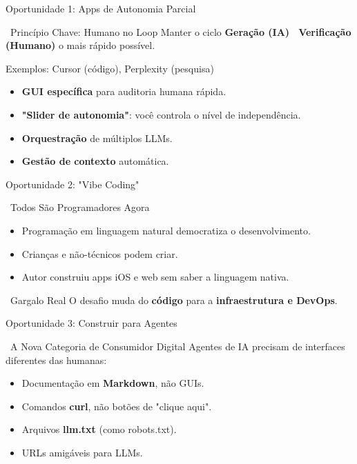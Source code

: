 \documentclass[aspectratio=169,12pt]{beamer}
\begin{document}
\begin{frame}{Oportunidade 1: Apps de Autonomia Parcial}
    \begin{block}{\faWrench\, Princípio Chave: Humano no Loop}
        Manter o ciclo \textbf{Geração (IA) \faArrowRight\, Verificação (Humano)} o mais rápido possível.
    \end{block}
    
    \begin{exampleblock}{Exemplos: Cursor (código), Perplexity (pesquisa)}
        \begin{itemize}
            \item \textbf{GUI específica} para auditoria humana rápida.
            \item \textbf{"Slider de autonomia"}: você controla o nível de independência.
            \item \textbf{Orquestração} de múltiplos LLMs.
            \item \textbf{Gestão de contexto} automática.
        \end{itemize}
    \end{exampleblock}
\end{frame}

\begin{frame}{Oportunidade 2: "Vibe Coding"}
    \begin{block}{\faUsers\, Todos São Programadores Agora}
        \begin{itemize}
            \item Programação em linguagem natural democratiza o desenvolvimento.
            \item Crianças e não-técnicos podem criar.
            \item Autor construiu apps iOS e web sem saber a linguagem nativa.
        \end{itemize}
    \end{block}
    
    \begin{alertblock}{\faExclamationTriangle\, Gargalo Real}
        O desafio muda do \textbf{código} para a \textbf{infraestrutura e DevOps}.
    \end{alertblock}
\end{frame}

\begin{frame}{Oportunidade 3: Construir para Agentes}
    \begin{block}{\faRobot\, A Nova Categoria de Consumidor Digital}
        Agentes de IA precisam de interfaces diferentes das humanas:
        \begin{itemize}
            \item Documentação em \textbf{Markdown}, não GUIs.
            \item Comandos \textbf{curl}, não botões de "clique aqui".
            \item Arquivos \textbf{llm.txt} (como robots.txt).
            \item URLs amigáveis para LLMs.
        \end{itemize}
    \end{block}
\end{frame}
\end{document}
